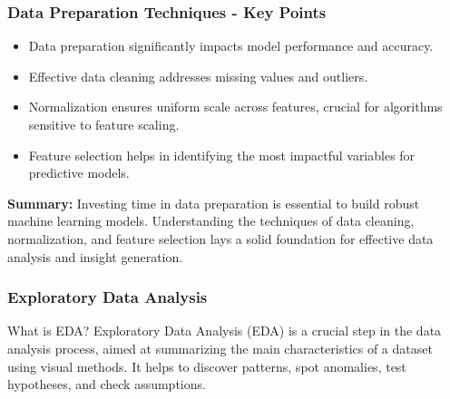 \documentclass{beamer}
\begin{document}
\begin{frame}[fragile]
    \frametitle{Data Preparation Techniques - Key Points}
    \begin{itemize}
        \item Data preparation significantly impacts model performance and accuracy.
        \item Effective data cleaning addresses missing values and outliers.
        \item Normalization ensures uniform scale across features, crucial for algorithms sensitive to feature scaling.
        \item Feature selection helps in identifying the most impactful variables for predictive models.
    \end{itemize}

    \textbf{Summary:} Investing time in data preparation is essential to build robust machine learning models. Understanding the techniques of data cleaning, normalization, and feature selection lays a solid foundation for effective data analysis and insight generation.
\end{frame}

\begin{frame}
    \frametitle{Exploratory Data Analysis}
    \begin{block}{What is EDA?}
        Exploratory Data Analysis (EDA) is a crucial step in the data analysis process, aimed at summarizing the main characteristics of a dataset using visual methods. It helps to discover patterns, spot anomalies, test hypotheses, and check assumptions.
    \end{block}
\end{frame}
\end{document}
